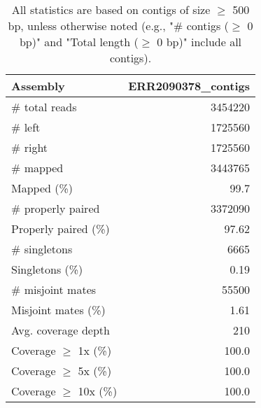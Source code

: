 \documentclass[12pt,a4paper]{article}
\begin{document}
\begin{table}[ht]
\begin{center}
\caption{All statistics are based on contigs of size $\geq$ 500 bp, unless otherwise noted (e.g., "\# contigs ($\geq$ 0 bp)" and "Total length ($\geq$ 0 bp)" include all contigs).}
\begin{tabular}{|l*{1}{|r}|}
\hline
Assembly & ERR2090378\_contigs \\ \hline
\# total reads & 3454220 \\ \hline
\# left & 1725560 \\ \hline
\# right & 1725560 \\ \hline
\# mapped & 3443765 \\ \hline
Mapped (\%) & 99.7 \\ \hline
\# properly paired & 3372090 \\ \hline
Properly paired (\%) & 97.62 \\ \hline
\# singletons & 6665 \\ \hline
Singletons (\%) & 0.19 \\ \hline
\# misjoint mates & 55500 \\ \hline
Misjoint mates (\%) & 1.61 \\ \hline
Avg. coverage depth & 210 \\ \hline
Coverage $\geq$ 1x (\%) & 100.0 \\ \hline
Coverage $\geq$ 5x (\%) & 100.0 \\ \hline
Coverage $\geq$ 10x (\%) & 100.0 \\ \hline
\end{tabular}
\end{center}
\end{table}
\end{document}
